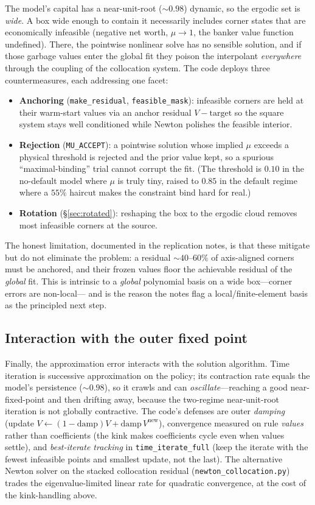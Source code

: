 \documentclass[11pt]{article}
\newcommand{\code}[1]{\texttt{#1}}
\begin{document}
The model's capital has a near-unit-root ($\sim0.98$) dynamic, so the
ergodic set is \emph{wide}. A box wide enough to contain it necessarily
includes corner states that are economically infeasible (negative net
worth, $\mu\to1$, the banker value function undefined). There, the
pointwise nonlinear solve has no sensible solution, and if those garbage
values enter the global fit they poison the interpolant \emph{everywhere}
through the coupling of the collocation system. The code deploys three
countermeasures, each addressing one facet:
\begin{itemize}
\item \textbf{Anchoring} (\code{make\_residual}, \code{feasible\_mask}):
      infeasible corners are held at their warm-start values via an anchor
      residual $V-\text{target}$ so the square system stays well conditioned
      while Newton polishes the feasible interior.
\item \textbf{Rejection} (\code{MU\_ACCEPT}): a pointwise solution whose
      implied $\mu$ exceeds a physical threshold is rejected and the prior
      value kept, so a spurious ``maximal-binding'' trial cannot corrupt the
      fit. (The threshold is $0.10$ in the no-default model where $\mu$ is
      truly tiny, raised to $0.85$ in the default regime where a $55\%$
      haircut makes the constraint bind hard for real.)
\item \textbf{Rotation} (\S\ref{sec:rotated}): reshaping the box to the
      ergodic cloud removes most infeasible corners at the source.
\end{itemize}
The honest limitation, documented in the replication notes, is that these
mitigate but do not eliminate the problem: a residual $\sim40$--$60\%$ of
axis-aligned corners must be anchored, and their frozen values floor the
achievable residual of the \emph{global} fit. This is intrinsic to a
\emph{global} polynomial basis on a wide box---corner errors are non-local---
and is the reason the notes flag a local/finite-element basis as the
principled next step.

\subsection{Interaction with the outer fixed point}

Finally, the approximation error interacts with the solution algorithm.
Time iteration is successive approximation on the policy; its contraction
rate equals the model's persistence ($\sim0.98$), so it crawls and can
\emph{oscillate}---reaching a good near-fixed-point and then drifting away,
because the two-regime near-unit-root iteration is not globally contractive.
The code's defenses are outer \emph{damping} (update
$V\leftarrow(1-\text{damp})V+\text{damp}\,V^{\text{new}}$), convergence
measured on rule \emph{values} rather than coefficients (the kink makes
coefficients cycle even when values settle), and \emph{best-iterate
tracking} in \code{time\_iterate\_full} (keep the iterate with the fewest
infeasible points and smallest update, not the last). The alternative
Newton solver on the stacked collocation residual
(\code{newton\_collocation.py}) trades the eigenvalue-limited linear rate
for quadratic convergence, at the cost of the kink-handling above.
\end{document}
